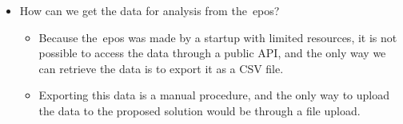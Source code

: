 \begin{itemize}
    \item How can we get the data for analysis from the~\acrshort{epos}?
    \begin{itemize}
        \item Because the~\acrshort{epos} was made by a startup with limited resources, it is not possible to access the
        data through a public API, and the only way we can retrieve the data is to export it as a CSV file.
        \item Exporting this data is a manual procedure, and the only way to upload the data to the proposed solution
        would be through a file upload.
    \end{itemize}
\end{itemize}